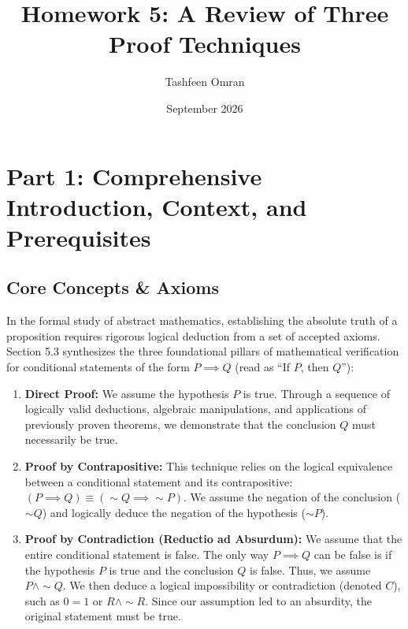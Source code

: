 \documentclass[11pt, a4paper]{article}
\title{\textbf{Homework 5: A Review of Three Proof Techniques}}
\author{Tashfeen Omran}
\date{September 2026}
\theoremstyle{definition}
\theoremstyle{remark}
\begin{document}
\maketitle
\tableofcontents
\newpage

\section{Part 1: Comprehensive Introduction, Context, and Prerequisites}

\subsection{Core Concepts \& Axioms}
In the formal study of abstract mathematics, establishing the absolute truth of a proposition requires rigorous logical deduction from a set of accepted axioms. Section 5.3 synthesizes the three foundational pillars of mathematical verification for conditional statements of the form $P \implies Q$ (read as ``If $P$, then $Q$''):
\begin{enumerate}
    \item \textbf{Direct Proof:} We assume the hypothesis $P$ is true. Through a sequence of logically valid deductions, algebraic manipulations, and applications of previously proven theorems, we demonstrate that the conclusion $Q$ must necessarily be true.
    \item \textbf{Proof by Contrapositive:} This technique relies on the logical equivalence between a conditional statement and its contrapositive: $(P \implies Q) \equiv (\sim Q \implies \sim P)$. We assume the negation of the conclusion ($\sim Q$) and logically deduce the negation of the hypothesis ($\sim P$).
    \item \textbf{Proof by Contradiction (Reductio ad Absurdum):} We assume that the entire conditional statement is false. The only way $P \implies Q$ can be false is if the hypothesis $P$ is true and the conclusion $Q$ is false. Thus, we assume $P \land \sim Q$. We then deduce a logical impossibility or contradiction (denoted $C$), such as $0 = 1$ or $R \land \sim R$. Since our assumption led to an absurdity, the original statement must be true.
\end{enumerate}
\end{document}
